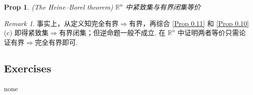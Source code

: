 \documentclass[hidelinks]{article}
\theoremstyle{definition}
\theoremstyle{plain}
\newtheorem{proposition}[theorem]{Prop}
\theoremstyle{remark}
\newtheorem*{remark}{Remark}
\begin{document}
\begin{proposition}(The Heine–Borel theorem)
$\mathbb{R}^n$ 中紧致集与有界闭集等价
\end{proposition}

\begin{remark}
事实上，从定义知完全有界$\Rightarrow$有界，再综合 \autoref{Prop 0.11} 和 \autoref{Prop 0.10} (c) 即得紧致集$\Rightarrow$有界闭集；但逆命题一般不成立. 在 $\mathbb{R}^n$ 中证明两者等价只需论证有界$\Rightarrow$完全有界即可.
\end{remark}


\subsection{Exercises}
none
\end{document}
